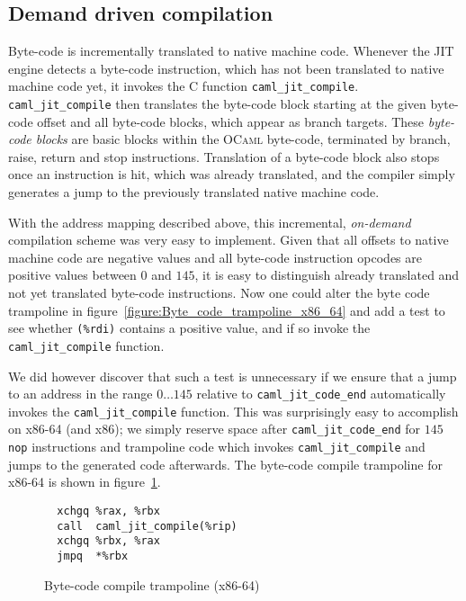 \documentclass[a4paper]{acm_proc_article-sp}
\begin{document}
\subsection{Demand driven compilation}

Byte-code is incrementally translated to native machine code. Whenever the JIT engine detects a
byte-code instruction, which has not been translated to native machine code yet, it invokes the
C function \texttt{caml\_jit\_compile}. \linebreak[4]\texttt{caml\_jit\_compile} then translates the byte-code
block starting at the given byte-code offset and all byte-code blocks, which appear as branch
targets. These \emph{byte-code blocks} are basic blocks within the \textsc{OCaml} byte-code,
terminated by branch, raise, return and stop instructions. Translation of a byte-code block also
stops once an instruction is hit, which was already translated, and the compiler simply generates
a jump to the previously translated native machine code.

With the address mapping described above, this incremental, \emph{on-demand} compilation scheme
was very easy to implement. Given that all offsets to native machine code are negative values and
all byte-code instruction opcodes are positive values between $0$ and $145$, it is easy to distinguish
already translated and not yet translated byte-code instructions. Now one could alter the byte code
trampoline in figure~\ref{figure:Byte_code_trampoline_x86_64} and add a test to see whether \texttt{(\%rdi)}
contains a positive value, and if so invoke the \texttt{caml\_jit\_compile} function.

We did however discover that such a test is unnecessary if we ensure that a jump to an address in
the range $0 \ldots 145$ relative to \texttt{caml\_jit\_code\_end} automatically invokes the
\texttt{caml\_jit\_compile} function. This was surprisingly easy to accomplish on x86-64 (and
x86); we simply reserve space after \texttt{caml\_jit\_code\_end} for $145$ \texttt{nop} instructions
and trampoline code which invokes \texttt{caml\_jit\_compile} and jumps to the generated code afterwards.
The byte-code compile trampoline for x86-64 is shown in figure~\ref{figure:Byte_code_compile_trampoline_x86_64}.

\begin{figure}[ht]
  \centering
  \begin{verbatim}
  xchgq %rax, %rbx
  call  caml_jit_compile(%rip)
  xchgq %rbx, %rax
  jmpq  *%rbx
\end{verbatim}
  \caption{Byte-code compile trampoline (x86-64)}
  \label{figure:Byte_code_compile_trampoline_x86_64}
\end{figure}
\end{document}
